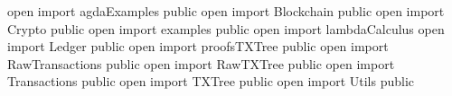 open import agdaExamples public
open import Blockchain public
open import Crypto public
open import examples public
open import lambdaCalculus
open import Ledger public
open import proofsTXTree public
open import RawTransactions public
open import RawTXTree public
open import Transactions public
open import TXTree public
open import Utils public
